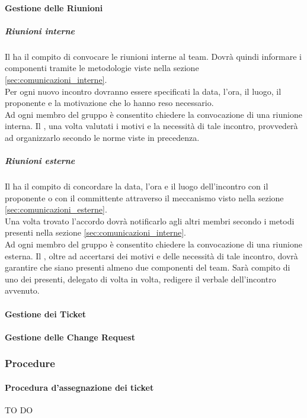 			\paragraph{Gestione delle Riunioni}
				\subparagraph{Riunioni interne}
Il \roleProjectManager{} ha il compito di convocare le riunioni interne al team. Dovrà quindi informare i componenti tramite le metodologie viste nella sezione \ref{sec:comunicazioni_interne}.\\
Per ogni nuovo incontro dovranno essere specificati la data, l’ora, il luogo, il proponente e la motivazione che lo hanno reso necessario. \\
Ad ogni membro del gruppo è consentito chiedere la convocazione di una riunione interna. Il \roleProjectManager{}, una volta valutati i motivi e la necessità di tale incontro, provvederà ad organizzarlo secondo le norme viste in precedenza.
				\subparagraph{Riunioni esterne} \label{sec:riunioni_esterne}
Il \roleProjectManager{} ha il compito di concordare la data, l’ora e il luogo dell'incontro con il proponente o con il committente attraverso il meccanismo visto nella sezione \ref{sec:comunicazioni_esterne}. \\
Una volta trovato l'accordo dovrà notificarlo agli altri membri secondo i metodi presenti nella sezione \ref{sec:comunicazioni_interne}. \\
Ad ogni membro del gruppo è consentito chiedere la convocazione di una riunione esterna. Il \roleProjectManager, oltre ad accertarsi dei motivi e delle necessità di tale incontro, dovrà garantire che siano presenti almeno due componenti del team. Sarà compito di uno dei presenti, delegato di volta in volta, redigere il verbale dell’incontro avvenuto.
			\paragraph{Gestione dei Ticket} \label{sec:gestione_dei_ticket}
			
			\paragraph{Gestione delle Change Request}
			
		\subsubsection{Procedure}
			\paragraph{Procedura d'assegnazione dei ticket}
TO DO

